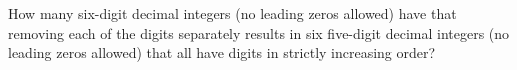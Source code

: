 How many six-digit decimal integers (no leading zeros allowed) have that removing each of the digits separately results in six five-digit decimal integers (no leading zeros allowed) that all have digits in strictly increasing order?